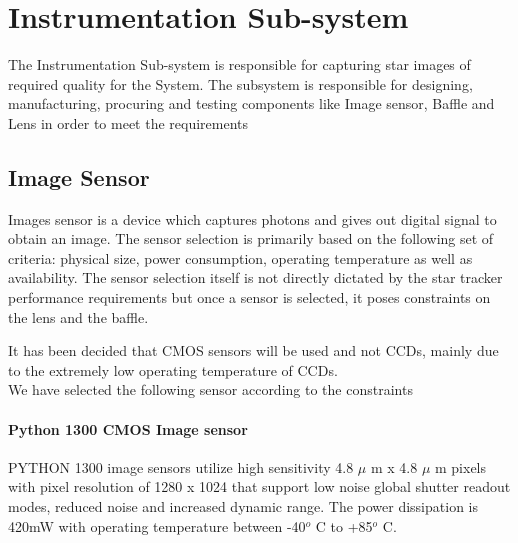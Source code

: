 \documentclass[../../main.tex]{subfiles}
\begin{document}
\chapter{Instrumentation Sub-system}
\thispagestyle{fancy}

%
%
%
%





The Instrumentation Sub-system is responsible for capturing star images of required quality for the System. The subsystem is responsible for designing, manufacturing, procuring and testing components like Image sensor, Baffle and Lens in order to meet the requirements 

\section{Image Sensor}
Images sensor is a device which captures photons and gives out digital signal to obtain an image.
The sensor selection is primarily based on the following set of criteria: physical size, power consumption, operating temperature as well as availability. The sensor selection itself is not directly dictated by the star tracker performance requirements but once a sensor is selected, it poses constraints on the lens and the baffle. \par It has been decided that CMOS sensors will be used and not CCDs, mainly due to the extremely low operating temperature of CCDs.
\\We have selected the following sensor according to the constraints
\subsubsection{Python 1300 CMOS Image sensor}
PYTHON 1300 image sensors utilize high sensitivity 4.8 $\mu$ m x 4.8 $\mu$ m pixels with pixel resolution of 1280 x 1024 that support low noise global shutter readout modes, reduced noise and increased dynamic range. The power dissipation is 420mW with operating temperature between -40$^o$ C to +85$^o$ C.
\end{document}
